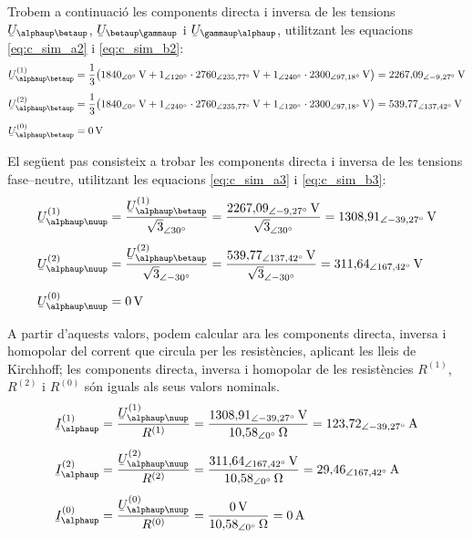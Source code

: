 \begin{exemple}
Trobem a continuaci\'{o} les components directa i inversa de les
tensions $\cmplx{U}_{\alphaup\betaup}$, $\cmplx{U}_{\betaup\gammaup}$ i
$\cmplx{U}_{\gammaup\alphaup}$, utilitzant les equacions
\eqref{eq:c_sim_a2} i \eqref{eq:c_sim_b2}:
\begin{align*}
\cmplx{U}_{\alphaup\betaup}\ap{(1)} &= \frac{1}{3} \big(
1840_{\angle 0\degree}\unit{V} + 1_{\angle
120\degree} \cdot 2760_{\angle 235{,}77\degree}\unit{V} +
1_{\angle 240\degree} \cdot 2300_{\angle
97{,}18\degree}\unit{V} \big) = 2267{,}09_{\angle -9{,}27\degree}\unit{V} \\[1ex]
\cmplx{U}_{\alphaup\betaup}\ap{(2)} &= \frac{1}{3} \big(
1840_{\angle 0\degree}\unit{V} + 1_{\angle
240\degree} \cdot 2760_{\angle 235{,}77\degree}\unit{V} +
1_{\angle 120\degree} \cdot 2300_{\angle
97{,}18\degree}\unit{V} \big) = 539{,}77_{\angle
137{,}42\degree}\unit{V} \\[1ex]
\cmplx{U}_{\alphaup\betaup}\ap{(0)} &= 0\unit{V}
\end{align*}

El seg\"{u}ent pas consisteix a trobar les components directa i inversa
de les tensions fase--neutre, utilitzant les equacions
\eqref{eq:c_sim_a3} i \eqref{eq:c_sim_b3}:
\begin{align*}
\cmplx{U}_{\alphaup\nuup}\ap{(1)} &=
\frac{\cmplx{U}_{\alphaup\betaup}\ap{(1)}}{\sqrt{3}_{\angle
30\degree}} = \frac{2267{,}09_{\angle
-9{,}27\degree}\unit{V}}{\sqrt{3}_{\angle
30\degree}} = 1308{,}91_{\angle -39{,}27\degree}\unit{V} \\[1ex]
\cmplx{U}_{\alphaup\nuup}\ap{(2)} &=
\frac{\cmplx{U}_{\alphaup\betaup}\ap{(2)}}{\sqrt{3}_{\angle
-30\degree}} = \frac{539{,}77_{\angle
137{,}42\degree}\unit{V}}{\sqrt{3}_{\angle -30\degree}} =
311{,}64_{\angle 167{,}42\degree}\unit{V} \\[1ex]
\cmplx{U}_{\alphaup\nuup}\ap{(0)} &= 0\unit{V}
\end{align*}

A partir d'aquests valors, podem calcular ara les components
directa, inversa i homopolar del corrent que circula per les
resist\`{e}ncies, aplicant les lleis de Kirchhoff; les components
directa, inversa i homopolar de les resist\`{e}ncies $R^{(1)}$,
$R^{(2)}$ i $R^{(0)}$ s\'{o}n iguals als seus valors nominals.
\begin{align*}
\cmplx{I}_\alphaup\ap{(1)} &=
\frac{\cmplx{U}_{\alphaup\nuup}\ap{(1)}}{R^{(1)}} =
\frac{1308{,}91_{\angle
-39{,}27\degree}\unit{V}}{10{,}58_{\angle 0 \degree}
\unit{\ohm}} =
123{,}72_{\angle -39{,}27\degree}\unit{A} \\[1ex]
\cmplx{I}_\alphaup\ap{(2)} &=
\frac{\cmplx{U}_{\alphaup\nuup}\ap{(2)}}{R^{(2)}} =
\frac{311{,}64_{\angle
167{,}42\degree}\unit{V}}{10{,}58_{\angle 0 \degree}
\unit{\ohm}} = 29{,}46_{\angle 167{,}42\degree}\unit{A} \\[1ex]
\cmplx{I}_\alphaup\ap{(0)} &=
\frac{\cmplx{U}_{\alphaup\nuup}\ap{(0)}}{R^{(0)}} =
\frac{0\unit{V}}{10{,}58_{\angle 0 \degree}\unit{\ohm}} =
0\unit{A}
\end{align*}


\end{exemple}
